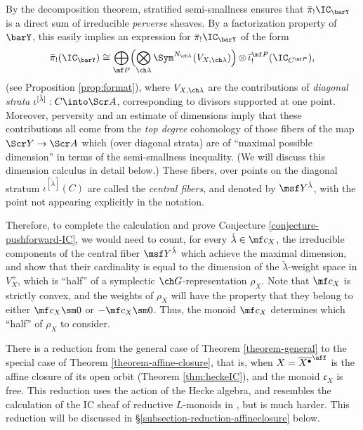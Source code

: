 \documentclass[final]{amsart}
\theoremstyle{remark}
\theoremstyle{definition}
\DeclareMathOperator*{\ot}{\otimes}
\numberwithin{equation}{section}
\begin{document}
\smallskip

By the decomposition theorem, stratified semi-smallness ensures that $\bar\pi_! \IC_{\barY}$ is a direct sum of irreducible \emph{perverse} sheaves. By a factorization property of $\barY$, this easily implies an expression for $\bar\pi_! \IC_{\barY}$ of the form
\begin{equation} \label{e:format1-intro}
 \bar\pi_!(\IC_{\barY}) \cong 
\bigoplus_{\mf P} 
\Bigl( \bigotimes_{\ch\lambda} 
\Sym^{N_{\ch\lambda}}(V_{X,\ch\lambda}) \Bigr) \ot 
\bar\iota^{\mf P}_!( \IC_{C^{\mf P}} ),
\end{equation}
(see Proposition \ref{prop:format}), where $V_{X,\ch\lambda}$ are the contributions of \emph{diagonal strata} $\iota^{[\check\lambda]}: C \into \Scr A$, corresponding to divisors supported at one point. Moreover, perversity and an estimate of dimensions imply that these contributions all come from the \emph{top degree} cohomology of those fibers of the map $\Scr Y\to \Scr A$ which (over diagonal strata) are of ``maximal possible dimension'' in terms of the semi-smallness  inequality. (We will discuss this dimension calculus in detail below.) These fibers, over points on the diagonal stratum $\iota^{[\check\lambda]}(C)$ are called the \emph{central fibers}, and denoted by $\msf Y^{\check\lambda}$, with the point not appearing explicitly in the notation. 


\medskip


Therefore, to complete the calculation and prove Conjecture \ref{conjecture-pushforward-IC}, we would need to count, for every $\check\lambda \in \mf c_X$, the irreducible components of the central fiber $\msf Y^{\check\lambda}$ which achieve the maximal dimension, and show that their cardinality is equal to the dimension of the $\check\lambda$-weight space in $V_X^+$, which is ``half'' of a symplectic $\ch G$-representation $\rho_X$. 
Note that $\mf c_X$ is strictly convex, and the weights of $\rho_X$ will have the property that 
they belong to either $\mf c_X\sm 0$ or $-\mf c_X \sm 0$.  Thus, the monoid $\mf c_X$ determines
which ``half'' of $\rho_X$ to consider.

\smallskip

There is a reduction from the general case of Theorem \ref{theorem-general} to the special case of Theorem \ref{theorem-affine-closure}, that is, when $X=\overline{X^\bullet}^\aff$ is the affine closure of its open orbit (Theorem \ref{thm:heckeIC}), and the monoid $\mathfrak c_X$ is free. This reduction uses the action of the Hecke algebra, and resembles the calculation of the IC sheaf of reductive $L$-monoids in \cite{BNS}, but is much harder. This reduction will be discussed in \S \ref{subsection-reduction-affineclosure} below.
\end{document}
